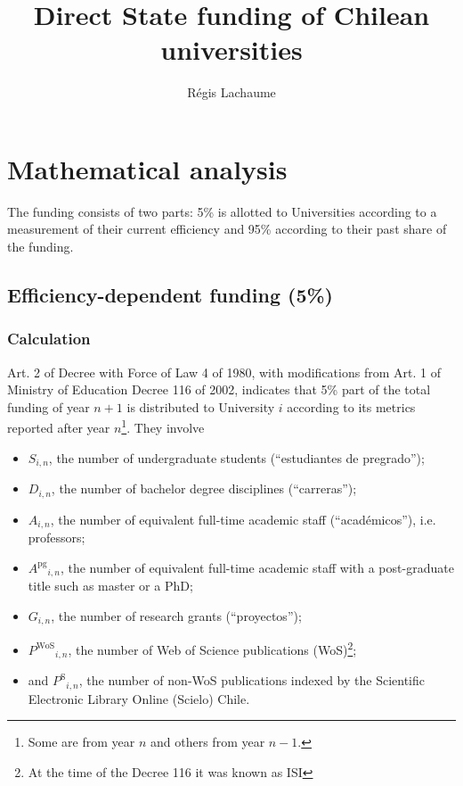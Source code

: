 \documentclass[twocolumn]{article}
\title{Direct State funding of Chilean universities}
\author{Régis Lachaume}
\def\npup{\ensuremath{S}}
\def\nmaj{\ensuremath{D}}
\def\nprof{\ensuremath{A}}
\def\ngrad{\ensuremath{A^\text{pg}}}
\def\ngrant{\ensuremath{G}}
\def\nisi{\ensuremath{P^\text{WoS}}}
\def\nscielo{\ensuremath{P^\text{S}}}
\begin{document}
\maketitle

\section{Mathematical analysis}
The funding consists of two parts: 5\% is allotted to Universities according to a measurement of their current efficiency and 95\% according to their past share of the funding.

\subsection{Efficiency-dependent funding (5\%)}
\subsubsection{Calculation}
\label{sec:metrics}

Art. 2 of Decree with Force of Law 4 of 1980, with modifications from Art. 1 of Ministry of Education Decree 116 of 2002, indicates that 5\% part of the total funding of year $n + 1$ is distributed to University $i$ according to its metrics reported after year $n$\footnote{Some are from year $n$ and others from year $n-1$.}. They involve 
\begin{itemize}
\item $\npup_{i,n}$, the number of undergraduate students (``estudiantes de pregrado'');
\item $\nmaj_{i,n}$, the number of bachelor degree disciplines (``carreras'');
\item $\nprof_{i,n}$, the number of equivalent full-time academic staff (``académicos''), i.e. professors;
\item $\ngrad_{i,n}$, the number of equivalent full-time academic staff with a post-graduate title such as master or a PhD; 
\item $\ngrant_{i,n}$, the number of research grants (``proyectos'');
\item $\nisi_{i,n}$, the number of Web of Science publications (WoS)\footnote{At the time of the Decree 116 it was known as ISI}; 
\item and $\nscielo_{i,n}$, the number of non-WoS publications indexed by the Scientific Electronic Library Online (Scielo) Chile. 
\end{itemize}
\end{document}
